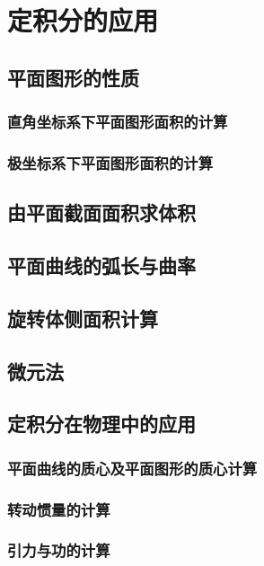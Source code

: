 

\chapter{定积分的应用}\label{ch:8}
\section{平面图形的性质}
\subsection{直角坐标系下平面图形面积的计算}
\subsection{极坐标系下平面图形面积的计算}
\begin{exercise}

\end{exercise}
\section{由平面截面面积求体积}
\begin{exercise}

\end{exercise}
\section{平面曲线的弧长与曲率}
\begin{exercise}

\end{exercise}
\section{旋转体侧面积计算}
\begin{exercise}

\end{exercise}
\section{微元法}
\section{定积分在物理中的应用}
\subsection{平面曲线的质心及平面图形的质心计算}
\subsection{转动惯量的计算}
\subsection{引力与功的计算}
\begin{exercise}

\end{exercise}
\begin{exercise*}

\end{exercise*}




\endinput
